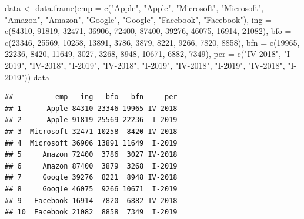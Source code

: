 \documentclass[
]{book}
\newenvironment{Shaded}{\begin{snugshade}}{\end{snugshade}}
\newcommand{\AttributeTok}[1]{\textcolor[rgb]{0.77,0.63,0.00}{#1}}
\newcommand{\DecValTok}[1]{\textcolor[rgb]{0.00,0.00,0.81}{#1}}
\newcommand{\FunctionTok}[1]{\textcolor[rgb]{0.00,0.00,0.00}{#1}}
\newcommand{\NormalTok}[1]{#1}
\newcommand{\OtherTok}[1]{\textcolor[rgb]{0.56,0.35,0.01}{#1}}
\newcommand{\StringTok}[1]{\textcolor[rgb]{0.31,0.60,0.02}{#1}}
\begin{document}
\begin{Shaded}
\begin{Highlighting}[]
\NormalTok{data }\OtherTok{\textless{}{-}} \FunctionTok{data.frame}\NormalTok{(}\AttributeTok{emp =} \FunctionTok{c}\NormalTok{(}\StringTok{"Apple"}\NormalTok{, }\StringTok{"Apple"}\NormalTok{, }\StringTok{"Microsoft"}\NormalTok{, }
  \StringTok{"Microsoft"}\NormalTok{, }\StringTok{"Amazon"}\NormalTok{, }\StringTok{"Amazon"}\NormalTok{, }\StringTok{"Google"}\NormalTok{, }\StringTok{"Google"}\NormalTok{, }
  \StringTok{"Facebook"}\NormalTok{, }\StringTok{"Facebook"}\NormalTok{), }\AttributeTok{ing =} \FunctionTok{c}\NormalTok{(}\DecValTok{84310}\NormalTok{, }\DecValTok{91819}\NormalTok{, }\DecValTok{32471}\NormalTok{, }
  \DecValTok{36906}\NormalTok{, }\DecValTok{72400}\NormalTok{, }\DecValTok{87400}\NormalTok{, }\DecValTok{39276}\NormalTok{, }\DecValTok{46075}\NormalTok{, }\DecValTok{16914}\NormalTok{, }\DecValTok{21082}\NormalTok{), }\AttributeTok{bfo =} \FunctionTok{c}\NormalTok{(}\DecValTok{23346}\NormalTok{, }
  \DecValTok{25569}\NormalTok{, }\DecValTok{10258}\NormalTok{, }\DecValTok{13891}\NormalTok{, }\DecValTok{3786}\NormalTok{, }\DecValTok{3879}\NormalTok{, }\DecValTok{8221}\NormalTok{, }\DecValTok{9266}\NormalTok{, }\DecValTok{7820}\NormalTok{, }\DecValTok{8858}\NormalTok{), }
  \AttributeTok{bfn =} \FunctionTok{c}\NormalTok{(}\DecValTok{19965}\NormalTok{, }\DecValTok{22236}\NormalTok{, }\DecValTok{8420}\NormalTok{, }\DecValTok{11649}\NormalTok{, }\DecValTok{3027}\NormalTok{, }\DecValTok{3268}\NormalTok{, }\DecValTok{8948}\NormalTok{, }
    \DecValTok{10671}\NormalTok{, }\DecValTok{6882}\NormalTok{, }\DecValTok{7349}\NormalTok{), }\AttributeTok{per =} \FunctionTok{c}\NormalTok{(}\StringTok{"IV{-}2018"}\NormalTok{, }\StringTok{"I{-}2019"}\NormalTok{, }
    \StringTok{"IV{-}2018"}\NormalTok{, }\StringTok{"I{-}2019"}\NormalTok{, }\StringTok{"IV{-}2018"}\NormalTok{, }\StringTok{"I{-}2019"}\NormalTok{, }\StringTok{"IV{-}2018"}\NormalTok{, }
    \StringTok{"I{-}2019"}\NormalTok{, }\StringTok{"IV{-}2018"}\NormalTok{, }\StringTok{"I{-}2019"}\NormalTok{))}
\NormalTok{data}
\end{Highlighting}
\end{Shaded}

\begin{verbatim}
##          emp   ing   bfo   bfn     per
## 1      Apple 84310 23346 19965 IV-2018
## 2      Apple 91819 25569 22236  I-2019
## 3  Microsoft 32471 10258  8420 IV-2018
## 4  Microsoft 36906 13891 11649  I-2019
## 5     Amazon 72400  3786  3027 IV-2018
## 6     Amazon 87400  3879  3268  I-2019
## 7     Google 39276  8221  8948 IV-2018
## 8     Google 46075  9266 10671  I-2019
## 9   Facebook 16914  7820  6882 IV-2018
## 10  Facebook 21082  8858  7349  I-2019
\end{verbatim}
\end{document}
